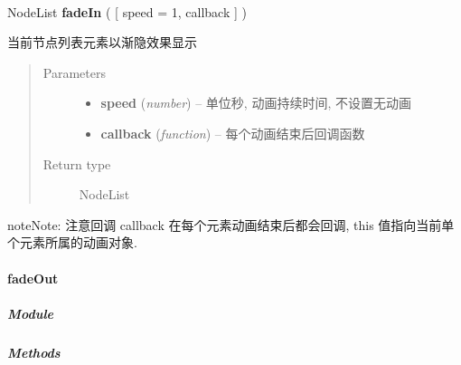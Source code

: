 \documentclass[letterpaper,10pt,english]{sphinxmanual}
\begin{document}
\begin{fulllineitems}
\label{api/core/node/fadeIn:Node.fadeIn}~
\begin{DUlineblock}{0em}
\item[] NodeList \textbf{fadeIn} ( {[} speed = 1, callback {]} )
\item[] 当前节点列表元素以渐隐效果显示
\end{DUlineblock}
\begin{quote}\begin{description}
\item[{Parameters}] \leavevmode\begin{itemize}
\item {}
\textbf{speed} (\emph{number}) -- 单位秒, 动画持续时间, 不设置无动画

\item {}
\textbf{callback} (\emph{function}) -- 每个动画结束后回调函数

\end{itemize}

\item[{Return type}] \leavevmode
NodeList

\end{description}\end{quote}

\begin{notice}{note}{Note:}
注意回调 callback 在每个元素动画结束后都会回调,  this 值指向当前单个元素所属的动画对象.
\end{notice}

\end{fulllineitems}



\paragraph{fadeOut}
\label{api/core/node/fadeOut:fadeout}\label{api/core/node/fadeOut::doc}

\subparagraph{Module}
\label{api/core/node/fadeOut:module}\begin{quote}

{\hyperref[api/core/node/index:module-Node]{}}
\end{quote}


\subparagraph{Methods}
\label{api/core/node/fadeOut:methods}
\end{document}
